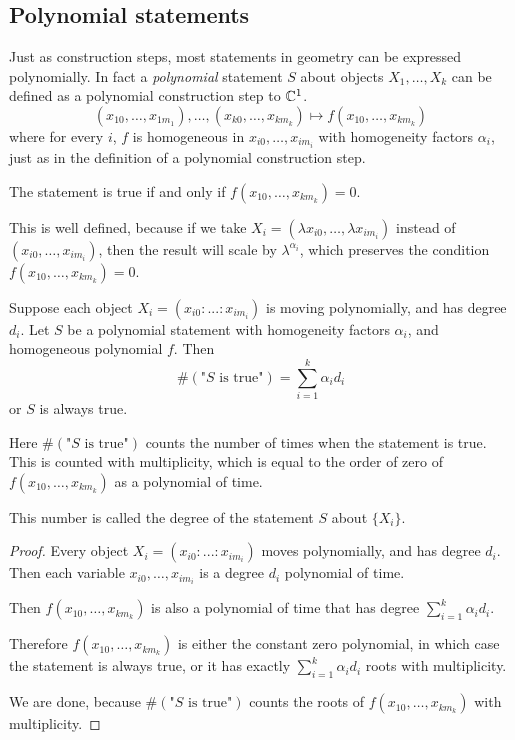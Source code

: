 \documentclass[a4paper]{article}
\begin{document}
\subsection{Polynomial statements}

Just as construction steps, most statements in geometry can be expressed polynomially. In fact a \textit{polynomial} statement $S$ about objects $X_1,\ldots, X_k$ can be defined as a polynomial construction step to $\mathbb{C}^1$.
$$(x_{10},\ldots,x_{1m_1}),\ldots,(x_{k0},\ldots,x_{km_k})\mapsto f(x_{10},\ldots ,x_{km_k})$$
where for every $i$, $f$ is homogeneous in $x_{i0},\ldots,x_{im_i}$ with homogeneity factors $\alpha_i$, just as in the definition of a polynomial construction step.

The statement is true if and only if $f(x_{10},\ldots ,x_{km_k})=0$.

This is well defined, because if we take $X_i=(\lambda x_{i0},\ldots ,\lambda x_{im_i})$ instead of $(x_{i0},\ldots ,x_{im_i})$, then the result will scale by $\lambda^{\alpha_i}$, which preserves the condition $f(x_{10},\ldots ,x_{km_k})=0$.

\begin{lemma}\label{degst}
    Suppose each object $X_i=(x_{i0}:...:x_{im_i})$ is moving polynomially, and has degree $d_i$. Let $S$ be a polynomial statement with homogeneity factors $\alpha_i$, and homogeneous polynomial $f$. Then
    $$\#(\text{"$S$ is true"})=\sum_{i=1}^k \alpha_id_i$$
    or $S$ is always true.

    Here $\#(\text{"$S$ is true"})$ counts the number of times when the statement is true. This is counted with multiplicity, which is equal to the order of zero of $f(x_{10},\ldots ,x_{km_k})$ as a polynomial of time.

    This number is called the degree of the statement $S$ about $\{X_i\}$.
\end{lemma}
\begin{proof}
    Every object $X_i=(x_{i0}:...:x_{im_i})$ moves polynomially, and has degree $d_i$. Then each variable $x_{i0},\ldots ,x_{im_i}$ is a degree $d_i$ polynomial of time.

    Then $f(x_{10},\ldots ,x_{km_k})$ is also a polynomial of time that has degree $\sum_{i=1}^k \alpha_id_i$.

    Therefore $f(x_{10},\ldots ,x_{km_k})$ is either the constant zero polynomial, in which case the statement is always true, or it has exactly $\sum_{i=1}^k \alpha_id_i$ roots with multiplicity.

    We are done, because $\#(\text{"$S$ is true"})$ counts the roots of $f(x_{10},\ldots ,x_{km_k})$ with multiplicity.
\end{proof}
\end{document}

